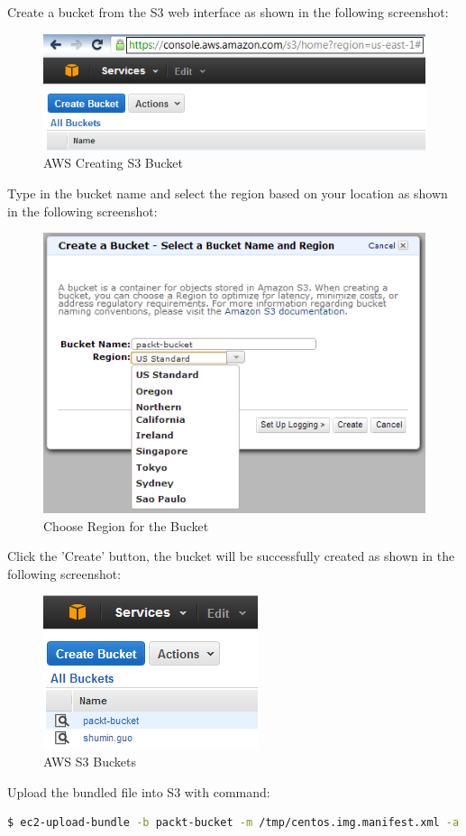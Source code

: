 Create a bucket from the S3 web interface as shown in the following screenshot:
\begin{figure}[ht]
  \centering
  \includegraphics[width=.75\textwidth]{figs/5163os_08_17.png}
  \caption{AWS Creating S3 Bucket}\label{fig:aws.s3.bucket.create}
\end{figure} 
Type in the bucket name and select the region based on your location as shown in the following screenshot:
\begin{figure}[ht]
  \centering
  \includegraphics[width=.70\textwidth]{figs/5163os_08_18.png}
  \caption{Choose Region for the Bucket}\label{fig:aws.s3.bucket.region}
\end{figure} 
Click the 'Create' button, the bucket will be successfully created as shown in the following screenshot:
\begin{figure}[ht]
  \centering
  \includegraphics[width=.40\textwidth]{figs/5163os_08_19.png}
  \caption{AWS S3 Buckets}\label{fig:aws.s3.buckets}
\end{figure} 
Upload the bundled file into S3 with command:
\lstset{style=bashstyle}
\begin{lstlisting}[language=bash]
$ ec2-upload-bundle -b packt-bucket -m /tmp/centos.img.manifest.xml -a AKIAJ7GAQT52MZKJA4WQ -s QDHHZ0/Mj5pDYFWKpqEzXhwjqM1UB+cqjGQQ6l3S
\end{lstlisting}

